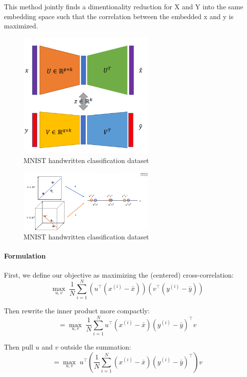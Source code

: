 \documentclass[11pt]{article}
\begin{document}
This method jointly finds a dimentionality reduction for X and Y into the same embedding space such that the correlation between the embedded x and y is maximized.

\begin{figure}[h!]
	\centering
	\includegraphics[width=0.6\textwidth]{../imgs/cca.png}
	\caption{MNIST handwritten classification dataset}
\end{figure}


\begin{figure}[h!]
	\centering
	\includegraphics[width=0.6\textwidth]{../imgs/cca-proj.png}
	\caption{MNIST handwritten classification dataset}
\end{figure}

\paragraph{Formulation}

First, we define our objective as maximizing the (centered) cross-correlation:
\[
\max_{u,v} \; \frac{1}{N} \sum_{i=1}^N 
\left(u^\top (x^{(i)} - \bar{x})\right)
\left(v^\top (y^{(i)} - \bar{y})\right)
\]

Then rewrite the inner product more compactly:
\[
= \max_{u,v} \; \frac{1}{N} \sum_{i=1}^N 
u^\top (x^{(i)} - \bar{x}) (y^{(i)} - \bar{y})^\top v
\]

Then pull \(u\) and \(v\) outside the summation:
\[
= \max_{u,v} \; u^\top 
\left(
\frac{1}{N} \sum_{i=1}^N (x^{(i)} - \bar{x})(y^{(i)} - \bar{y})^\top
\right)
v
\]
\end{document}
